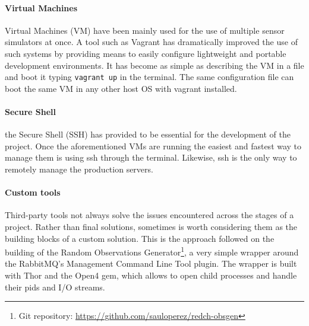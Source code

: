 \paragraph{Virtual Machines} Virtual Machines (VM) have been mainly used for the use of multiple sensor simulators at once. A tool such as Vagrant has dramatically improved the use of such systems by providing means to easily configure lightweight and portable development environments. It has become as simple as describing the VM in a file and boot it typing \texttt{vagrant up} in the terminal. The same configuration file can boot the same VM in any other host OS with vagrant installed.


\paragraph{Secure Shell} the Secure Shell (SSH) has provided to be essential for the development of the project. Once the aforementioned VMs are running the easiest and fastest way to manage them is using ssh through the terminal. Likewise, ssh is the only way to remotely manage the production servers.

\paragraph{Custom tools} Third-party tools not always solve the issues encountered across the stages of a project. Rather than final solutions, sometimes is worth considering them as the building blocks of a custom solution. This is the approach followed on the building of the Random Observations Generator\footnote{Git repository: \url{https://github.com/sauloperez/redch-obsgen}}, a very simple wrapper around the RabbitMQ's Management Command Line Tool plugin. The wrapper is built with Thor and the Open4 gem, which allows to open child processes and handle their pids and I/O streams.

